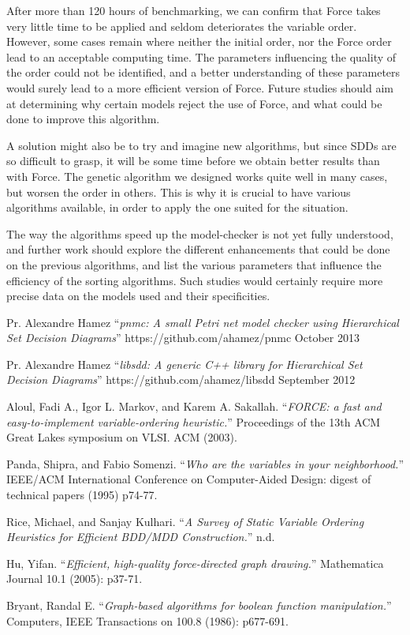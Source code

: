\documentclass[12pt]{report}
\begin{document}
After more than 120 hours of benchmarking, we can confirm that Force takes very little time to be applied and seldom deteriorates the variable order. However, some cases remain where neither the initial order, nor the Force order lead to an acceptable computing time. The parameters influencing the quality of the order could not be identified, and a better understanding of these parameters would surely lead to a more efficient version of Force. Future studies should aim at determining why certain models reject the use of Force, and what could be done to improve this algorithm.

A solution might also be to try and imagine new algorithms, but since SDDs are so difficult to grasp, it will be some time before we obtain better results than with Force. The genetic algorithm we designed works quite well in many cases, but worsen the order in others. This is why it is crucial to have various algorithms available, in order to apply the one suited for the situation.

The way the algorithms speed up the model-checker is not yet fully understood, and further work should explore the different enhancements that could be done on the previous algorithms, and list the various parameters that influence the efficiency of the sorting algorithms. Such studies would certainly require more precise data on the models used and their specificities.

\begin{thebibliography}{1}

   Pr. Alexandre Hamez \enquote{\em pnmc: A small Petri net model checker using Hierarchical Set Decision Diagrams} https://github.com/ahamez/pnmc October 2013

   Pr. Alexandre Hamez \enquote{\em libsdd: A generic C++ library for Hierarchical Set Decision Diagrams} https://github.com/ahamez/libsdd September 2012

   Aloul, Fadi A., Igor L. Markov, and Karem A. Sakallah. \enquote{\em FORCE: a fast and easy-to-implement variable-ordering heuristic.} Proceedings of the 13th ACM Great Lakes symposium on VLSI. ACM (2003).

   Panda, Shipra, and Fabio Somenzi. \enquote{\em Who are the variables in your neighborhood.} IEEE/ACM International Conference on Computer-Aided Design: digest of technical papers (1995) p74-77.

   Rice, Michael, and Sanjay Kulhari. \enquote{\em A Survey of Static Variable Ordering Heuristics for Efficient BDD/MDD Construction.} n.d.

   Hu, Yifan. \enquote{\em Efficient, high-quality force-directed graph drawing.} Mathematica Journal 10.1 (2005): p37-71.

   Bryant, Randal E. \enquote{\em Graph-based algorithms for boolean function manipulation.} Computers, IEEE Transactions on 100.8 (1986): p677-691.

  \end{thebibliography}
\end{document}
